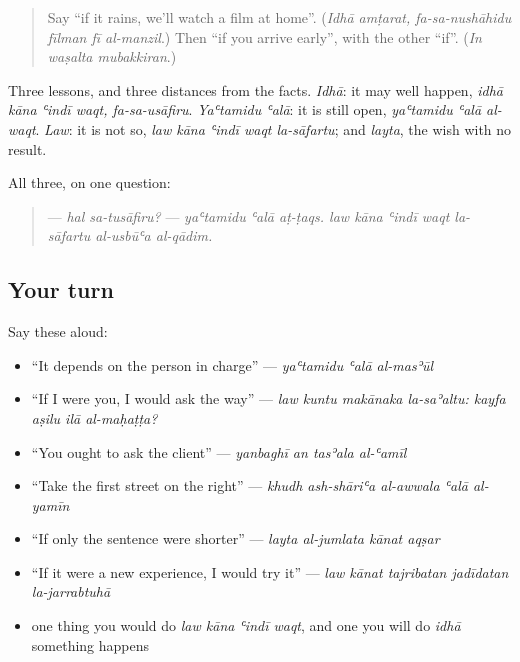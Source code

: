 \label{lesson:AR-R292-would-and-depends}



\begin{quote}
Say \textquotedblleft{}if it rains, we'll watch a film at home\textquotedblright{}. (\emph{Idhā amṭarat, fa-sa-nushāhidu fīlman fī al-manzil}.) Then \textquotedblleft{}if you arrive early\textquotedblright{}, with the other \textquotedblleft{}if\textquotedblright{}. (\emph{In waṣalta mubakkiran}.)
\end{quote}

\begin{grammarlens}[title={What you've built}]
Three lessons, and three distances from the facts. \emph{Idhā}: it may well happen, \emph{idhā kāna ʿindī waqt, fa-sa-usāfiru}. \emph{Yaʿtamidu ʿalā}: it is still open, \emph{yaʿtamidu ʿalā al-waqt}. \emph{Law}: it is not so, \emph{law kāna ʿindī waqt la-sāfartu}; and \emph{layta}, the wish with no result.

All three, on one question:

\begin{quote}
— \emph{hal sa-tusāfiru?} — \emph{yaʿtamidu ʿalā aṭ-ṭaqs. law kāna ʿindī waqt la-sāfartu al-usbūʿa al-qādim.}
\end{quote}
\end{grammarlens}

\subsection*{Your turn}
Say these aloud:

\begin{itemize}
\raggedright
  \item \textquotedblleft{}It depends on the person in charge\textquotedblright{} — \emph{yaʿtamidu ʿalā al-masʾūl}
  \item \textquotedblleft{}If I were you, I would ask the way\textquotedblright{} — \emph{law kuntu makānaka la-saʾaltu: kayfa aṣilu ilā al-maḥaṭṭa?}
  \item \textquotedblleft{}You ought to ask the client\textquotedblright{} — \emph{yanbaghī an tasʾala al-ʿamīl}
  \item \textquotedblleft{}Take the first street on the right\textquotedblright{} — \emph{khudh ash-shāriʿa al-awwala ʿalā al-yamīn}
  \item \textquotedblleft{}If only the sentence were shorter\textquotedblright{} — \emph{layta al-jumlata kānat aqṣar}
  \item \textquotedblleft{}If it were a new experience, I would try it\textquotedblright{} — \emph{law kānat tajribatan jadīdatan la-jarrabtuhā}
  \item one thing you would do \emph{law kāna ʿindī waqt}, and one you will do \emph{idhā} something happens
\end{itemize}

